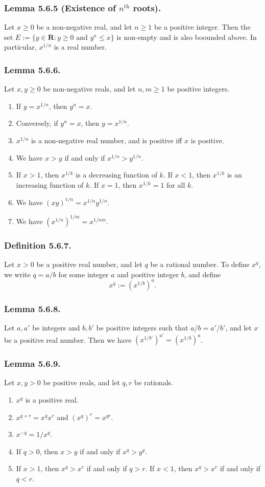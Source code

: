 \documentclass[12pt, letter]{article}
\begin{document}
\subsubsection*{Lemma 5.6.5 (Existence of $n^\text{th}$ roots).}
Let $x\geq 0$ be a non-negative real, and let $n\geq 1$ be a positive integer. Then the set $E:=\{y\in\mathbf{R}:y\geq 0\text{ and }y^n\leq x\}$ is non-empty
and is also boounded above. In particular, $x^{1/n}$ is a real number.
\subsubsection*{Lemma 5.6.6.}
Let $x,y\geq 0$ be non-negative reals, and let $n,m\geq 1$ be positive integers.
\begin{enumerate}[label=(\alph*)]
    \item If $y=x^{1/n}$, then $y^n=x$.
    \item Conversely, if $y^n=x$, then $y=x^{1/n}$.
    \item $x^{1/n}$ is a non-negative real number, and is positive iff $x$ is positive.
    \item We have $x>y$ if and only if $x^{1/n}>y^{1/n}$.
    \item If $x>1$, then $x^{1/k}$ is a decreasing function of $k$. If $x<1$, then $x^{1/k}$ is an increasing function of $k$. If $x=1$, then $x^{1/k}=1$ for all $k$.
    \item We have $(xy)^{1/n}=x^{1/n}y^{1/n}$.
    \item We have $(x^{1/n})^{1/m}=x^{1/nm}$.
\end{enumerate}
\subsubsection*{Definition 5.6.7.}
Let $x>0$ be a positive real number, and let $q$ be a rational number. To define $x^q$, we write $q=a/b$ for some integer $a$ and positive integer $b$, and define
\begin{equation*}
    x^q:=(x^{1/b})^a.
\end{equation*}
\subsubsection*{Lemma 5.6.8.}
Let $a,a'$ be integers and $b,b'$ be positive integers such that $a/b=a'/b'$, and let $x$ be a positive real number. Then we have $(x^{1/b'})^{a'}=(x^{1/b})^a$.
\subsubsection*{Lemma 5.6.9.}
Let $x,y>0$ be positive reals, and let $q,r$ be rationals. 
\begin{enumerate}[label=(\alph*)]
    \item $x^q$ is a positive real.
    \item $x^{q+r}=x^q x^r$ and $(x^q)^r=x^{qr}$.
    \item $x^{-q}=1/x^q$.
    \item If $q>0$, then $x>y$ if and only if $x^q>y^q$.
    \item If $x>1$, then $x^q>x^r$ if and only if $q>r$. If $x<1$, then $x^q>x^r$ if and only if $q<r$.
\end{enumerate}
\end{document}
